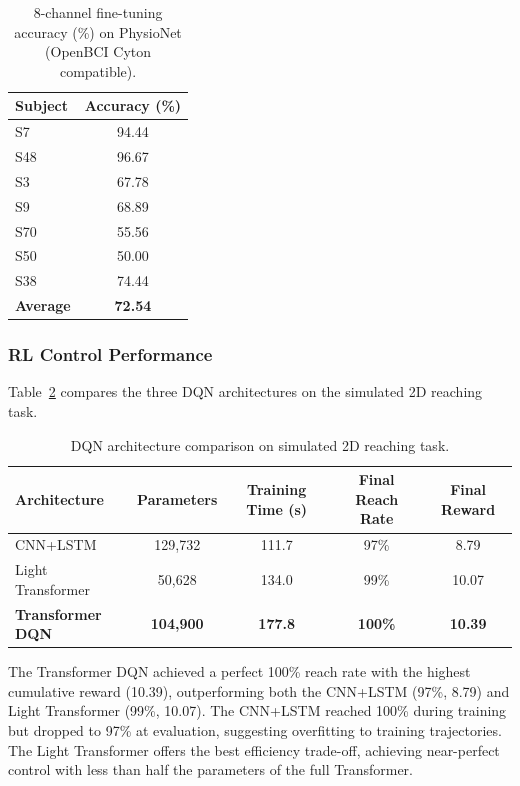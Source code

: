 \documentclass[12pt, a4paper]{article}
\begin{document}
\begin{table}[htbp]
\centering
\caption{8-channel fine-tuning accuracy (\%) on PhysioNet (OpenBCI Cyton compatible).}
\label{tab:8ch_finetune}
\begin{tabular}{lc}
\toprule
\textbf{Subject} & \textbf{Accuracy (\%)} \\
\midrule
S7  & 94.44 \\
S48 & 96.67 \\
S3  & 67.78 \\
S9  & 68.89 \\
S70 & 55.56 \\
S50 & 50.00 \\
S38 & 74.44 \\
\midrule
\textbf{Average} & \textbf{72.54} \\
\bottomrule
\end{tabular}
\end{table}

\subsubsection{RL Control Performance}

Table~\ref{tab:dqn_comparison} compares the three DQN architectures on the simulated 2D reaching task.

\begin{table}[htbp]
\centering
\caption{DQN architecture comparison on simulated 2D reaching task.}
\label{tab:dqn_comparison}
\begin{tabular}{lcccc}
\toprule
\textbf{Architecture} & \textbf{Parameters} & \textbf{Training Time (s)} & \textbf{Final Reach Rate} & \textbf{Final Reward} \\
\midrule
CNN+LSTM          & 129,732  & 111.7  & 97\%  & 8.79 \\
Light Transformer & 50,628   & 134.0  & 99\%  & 10.07 \\
\textbf{Transformer DQN} & \textbf{104,900} & \textbf{177.8} & \textbf{100\%} & \textbf{10.39} \\
\bottomrule
\end{tabular}
\end{table}

The Transformer DQN achieved a perfect 100\% reach rate with the highest cumulative reward (10.39), outperforming both the CNN+LSTM (97\%, 8.79) and Light Transformer (99\%, 10.07). The CNN+LSTM reached 100\% during training but dropped to 97\% at evaluation, suggesting overfitting to training trajectories. The Light Transformer offers the best efficiency trade-off, achieving near-perfect control with less than half the parameters of the full Transformer.
\end{document}
